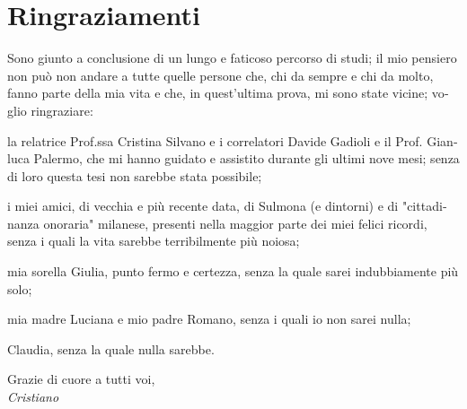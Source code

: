 \chapter*{Ringraziamenti}

\begin{otherlanguage}{italian}





Sono giunto a conclusione di un lungo e faticoso percorso di studi; il mio pensiero non può non andare a tutte quelle persone che, chi da sempre e chi da molto, fanno parte della mia vita e che, in quest'ultima prova, mi sono state vicine; voglio ringraziare:


\par\bigskip


la relatrice Prof.ssa Cristina Silvano e i correlatori Davide Gadioli e il Prof. Gianluca Palermo, che mi hanno guidato e assistito durante gli ultimi nove mesi; senza di loro questa tesi non sarebbe stata possibile;


\par\bigskip


i miei amici, di vecchia e più recente data, di Sulmona (e dintorni) e di "cittadinanza onoraria" milanese, presenti nella maggior parte dei miei felici ricordi, senza i quali la vita sarebbe terribilmente più noiosa;


\par\bigskip


mia sorella Giulia, punto fermo e certezza, senza la quale sarei indubbiamente più solo;


\par\bigskip


mia madre Luciana e mio padre Romano, senza i quali io non sarei nulla;


\par\bigskip


Claudia, senza la quale nulla sarebbe.


\par\bigskip


\begin{flushright}

	Grazie di cuore a tutti voi,\\\textit{Cristiano}

\end{flushright}





\end{otherlanguage}
